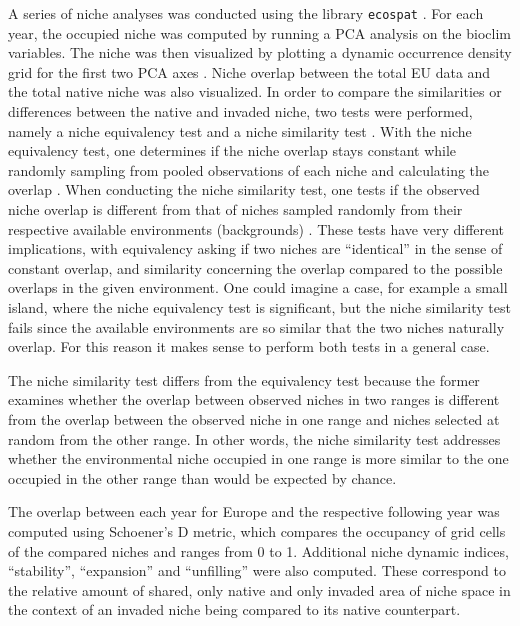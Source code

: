 \documentclass[12pt,a4paper]{article}
\begin{document}
A series of niche analyses was conducted using the library \texttt{ecospat} \autocite{dicola2017ecospat}.
For each year, the occupied niche was computed by running a PCA analysis on the bioclim variables.
The niche was then visualized by plotting a dynamic occurrence density grid for the first two PCA axes \autocite{broennimann2012niche}.
Niche overlap between the total EU data and the total native niche was also visualized.
In order to compare the similarities or differences between the native and invaded niche, two tests were performed, namely a niche equivalency test and a niche similarity test \autocite{broennimann2012niche}.
With the niche equivalency test, one determines if the niche overlap stays constant while randomly sampling from pooled observations of each niche and calculating the overlap \autocite{broennimann2012niche}.
When conducting the niche similarity test, one tests if the observed niche overlap is different from that of niches sampled randomly from their respective available environments (backgrounds) \autocite{broennimann2012niche}.
These tests have very different implications, with equivalency asking if two niches are ``identical'' in the sense of constant overlap, and similarity concerning the overlap compared to the possible overlaps in the given environment.
One could imagine a case, for example a small island, where the niche equivalency test is significant, but the niche similarity test fails since the available environments are so similar that the two niches naturally overlap.
For this reason it makes sense to perform both tests in a general case.


The niche similarity test differs from the equivalency test
because the former examines whether the overlap between
observed niches in two ranges is different from the overlap
between the observed niche in one range and niches selected at
random from the other range. In other words, the niche similarity test addresses whether the environmental niche occupied
in one range is more similar to the one occupied in the other
range than would be expected by chance.

The overlap between each year for Europe and the respective following year was computed using Schoener's D metric, which compares the occupancy of grid cells of the compared niches and ranges from 0 to 1.
Additional niche dynamic indices, ``stability'', ``expansion'' and ``unfilling'' \autocite{guisan2014nichedyn} were also computed.
These correspond to the relative amount of shared, only native and only invaded area of niche space in the context of an invaded niche being compared to its native counterpart.
\end{document}

